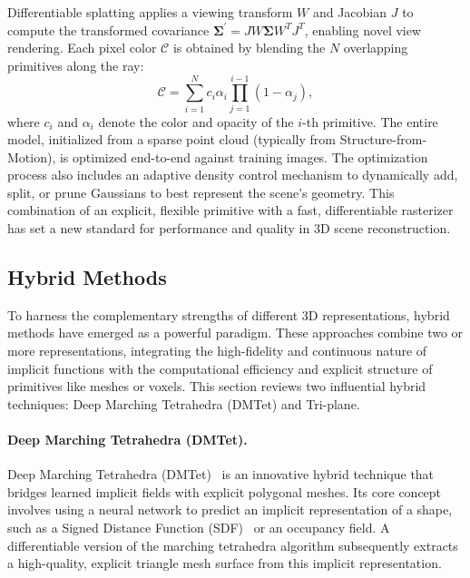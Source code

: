 Differentiable splatting applies a viewing transform $W$ and Jacobian $J$ to compute the transformed covariance $\boldsymbol{\Sigma}^{\prime} = JW\boldsymbol{\Sigma} W^TJ^T$, enabling novel view rendering. Each pixel color $\mathcal{C}$ is obtained by blending the $N$ overlapping primitives along the ray:
\begin{equation}
\mathcal{C} = \sum_{i=1}^{N}c_i \alpha_i \prod_{j=1}^{i-1} (1-\alpha_j),
\end{equation}
where $c_i$ and $\alpha_i$ denote the color and opacity of the $i$-th primitive.
The entire model, initialized from a sparse point cloud (typically from Structure-from-Motion), is optimized end-to-end against training images.
The optimization process also includes an adaptive density control mechanism to dynamically add, split, or prune Gaussians to best represent the scene's geometry.
This combination of an explicit, flexible primitive with a fast, differentiable rasterizer has set a new standard for performance and quality in 3D scene reconstruction.





\subsection{Hybrid Methods}
\label{sec:rep_3d_hybrid}
To harness the complementary strengths of different 3D representations, hybrid methods have emerged as a powerful paradigm.
These approaches combine two or more representations, integrating the high-fidelity and continuous nature of implicit functions with the computational efficiency and explicit structure of primitives like meshes or voxels.
This section reviews two influential hybrid techniques: Deep Marching Tetrahedra (DMTet) and Tri-plane.

\paragraph{Deep Marching Tetrahedra (DMTet).}
Deep Marching Tetrahedra (DMTet)~\cite{shen2021deep} is an innovative hybrid technique that bridges learned implicit fields with explicit polygonal meshes. 
Its core concept involves using a neural network to predict an implicit representation of a shape, such as a Signed Distance Function (SDF)~\cite{vicini2022differentiable} or an occupancy field. 
A differentiable version of the marching tetrahedra algorithm subsequently extracts a high-quality, explicit triangle mesh surface from this implicit representation.

